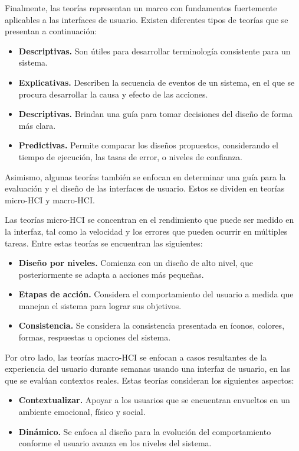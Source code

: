 Finalmente, las teorías representan un marco con fundamentos fuertemente aplicables a las interfaces de usuario. Existen diferentes tipos de teorías que se presentan a continuación:

\begin{itemize}
  \item \textbf{Descriptivas.} Son útiles para desarrollar terminología consistente para un sistema.
  \item \textbf{Explicativas.} Describen la secuencia de eventos de un sistema, en el que se procura desarrollar la causa y efecto de las acciones.
  \item \textbf{Descriptivas.} Brindan una guía para tomar decisiones del diseño de forma más clara.
  \item \textbf{Predictivas.} Permite comparar los diseños propuestos, considerando el tiempo de ejecución, las tasas de error, o niveles de confianza.
\end{itemize}

Asimismo, algunas teorías también se enfocan en determinar una guía para la evaluación y el diseño de las interfaces de usuario. Estos se dividen en teorías micro-HCI y macro-HCI.

Las teorías micro-HCI se concentran en el rendimiento que puede ser medido en la interfaz, tal como la velocidad y los errores que pueden ocurrir en múltiples tareas. Entre estas teorías se encuentran las siguientes:

\begin{itemize}
  \item \textbf{Diseño por niveles.} Comienza con un diseño de alto nivel, que posteriormente se adapta a acciones más pequeñas.
  \item \textbf{Etapas de acción.} Considera el comportamiento del usuario a medida que manejan el sistema para lograr sus objetivos.
  \item \textbf{Consistencia.} Se considera la consistencia presentada en íconos, colores, formas, respuestas u opciones del sistema.
\end{itemize}

Por otro lado, las teorías macro-HCI se enfocan a casos resultantes de la experiencia del usuario durante semanas usando una interfaz de usuario, en las que se evalúan contextos reales. Estas teorías consideran los siguientes aspectos:

\begin{itemize}
  \item \textbf{Contextualizar.} Apoyar a los usuarios que se encuentran envueltos en un ambiente emocional, físico y social.
  \item \textbf{Dinámico.} Se enfoca al diseño para la evolución del comportamiento conforme el usuario avanza en los niveles del sistema.
\end{itemize}

